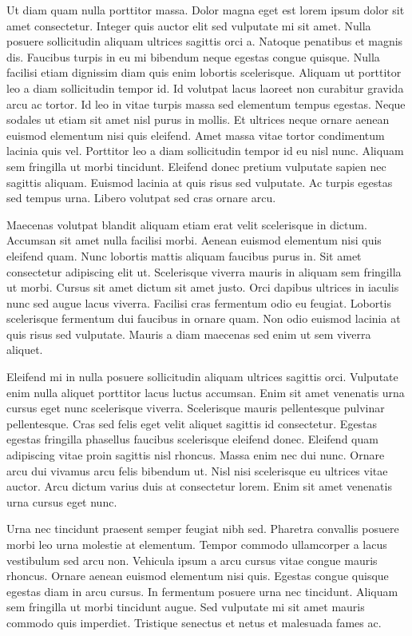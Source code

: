 \documentclass[11pt,a4paper]{article}
\begin{document}
Ut diam quam nulla porttitor massa. Dolor magna eget est lorem ipsum dolor sit amet consectetur. Integer quis auctor elit sed vulputate mi sit amet. Nulla posuere sollicitudin aliquam ultrices sagittis orci a. Natoque penatibus et magnis dis. Faucibus turpis in eu mi bibendum neque egestas congue quisque. Nulla facilisi etiam dignissim diam quis enim lobortis scelerisque. Aliquam ut porttitor leo a diam sollicitudin tempor id. Id volutpat lacus laoreet non curabitur gravida arcu ac tortor. Id leo in vitae turpis massa sed elementum tempus egestas. Neque sodales ut etiam sit amet nisl purus in mollis. Et ultrices neque ornare aenean euismod elementum nisi quis eleifend. Amet massa vitae tortor condimentum lacinia quis vel. Porttitor leo a diam sollicitudin tempor id eu nisl nunc. Aliquam sem fringilla ut morbi tincidunt. Eleifend donec pretium vulputate sapien nec sagittis aliquam. Euismod lacinia at quis risus sed vulputate. Ac turpis egestas sed tempus urna. Libero volutpat sed cras ornare arcu.

Maecenas volutpat blandit aliquam etiam erat velit scelerisque in dictum. Accumsan sit amet nulla facilisi morbi. Aenean euismod elementum nisi quis eleifend quam. Nunc lobortis mattis aliquam faucibus purus in. Sit amet consectetur adipiscing elit ut. Scelerisque viverra mauris in aliquam sem fringilla ut morbi. Cursus sit amet dictum sit amet justo. Orci dapibus ultrices in iaculis nunc sed augue lacus viverra. Facilisi cras fermentum odio eu feugiat. Lobortis scelerisque fermentum dui faucibus in ornare quam. Non odio euismod lacinia at quis risus sed vulputate. Mauris a diam maecenas sed enim ut sem viverra aliquet.

Eleifend mi in nulla posuere sollicitudin aliquam ultrices sagittis orci. Vulputate enim nulla aliquet porttitor lacus luctus accumsan. Enim sit amet venenatis urna cursus eget nunc scelerisque viverra. Scelerisque mauris pellentesque pulvinar pellentesque. Cras sed felis eget velit aliquet sagittis id consectetur. Egestas egestas fringilla phasellus faucibus scelerisque eleifend donec. Eleifend quam adipiscing vitae proin sagittis nisl rhoncus. Massa enim nec dui nunc. Ornare arcu dui vivamus arcu felis bibendum ut. Nisl nisi scelerisque eu ultrices vitae auctor. Arcu dictum varius duis at consectetur lorem. Enim sit amet venenatis urna cursus eget nunc.

Urna nec tincidunt praesent semper feugiat nibh sed. Pharetra convallis posuere morbi leo urna molestie at elementum. Tempor commodo ullamcorper a lacus vestibulum sed arcu non. Vehicula ipsum a arcu cursus vitae congue mauris rhoncus. Ornare aenean euismod elementum nisi quis. Egestas congue quisque egestas diam in arcu cursus. In fermentum posuere urna nec tincidunt. Aliquam sem fringilla ut morbi tincidunt augue. Sed vulputate mi sit amet mauris commodo quis imperdiet. Tristique senectus et netus et malesuada fames ac.
\end{document}
